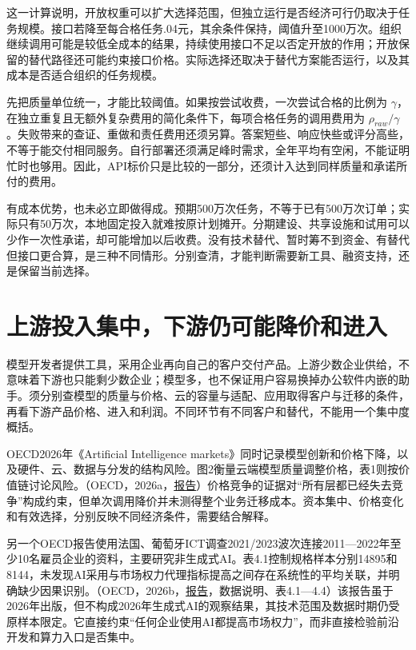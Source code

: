 \documentclass[UTF8,fontset=windows,12pt,a4paper,oneside,openany]{ctexbook}
\begin{document}
这一计算说明，开放权重可以扩大选择范围，但独立运行是否经济可行仍取决于任务规模。接口若降至每合格任务.04元，其余条件保持，阈值升至1000万次。组织继续调用可能是较低全成本的结果，持续使用接口不足以否定开放的作用；开放保留的替代路径还可能约束接口价格。实际选择还取决于替代方案能否运行，以及其成本是否适合组织的任务规模。

先把质量单位统一，才能比较阈值。如果按尝试收费，一次尝试合格的比例为 $\gamma$，在独立重复且无额外复杂费用的简化条件下，每项合格任务的调用费用为 $\rho_{raw}/\gamma$。失败带来的查证、重做和责任费用还须另算。答案短些、响应快些或评分高些，不等于能交付相同服务。自行部署还须满足峰时需求，全年平均有空闲，不能证明忙时也够用。因此，API标价只是比较的一部分，还须计入达到同样质量和承诺所付的费用。

有成本优势，也未必立即做得成。预期500万次任务，不等于已有500万次订单；实际只有50万次，本地固定投入就难按原计划摊开。分期建设、共享设施和试用可以少作一次性承诺，却可能增加以后收费。没有技术替代、暂时筹不到资金、有替代但接口更合算，是三种不同情形。分别查清，才能判断需要新工具、融资支持，还是保留当前选择。

\section{上游投入集中，下游仍可能降价和进入}

模型开发者提供工具，采用企业再向自己的客户交付产品。上游少数企业供给，不意味着下游也只能剩少数企业；模型多，也不保证用户容易换掉办公软件内嵌的助手。须分别查模型的质量与价格、云的容量与适配、应用取得客户与迁移的条件，再看下游产品价格、进入和利润。不同环节有不同客户和替代，不能用一个集中度概括。

OECD2026年《Artificial Intelligence markets》同时记录模型创新和价格下降，以及硬件、云、数据与分发的结构风险。图2衡量云端模型质量调整价格，表1则按价值链讨论风险。（OECD，2026a，\href{https://doi.org/10.1787/d531d73f-en}{报告}）价格竞争的证据对“所有层都已经失去竞争”构成约束，但单次调用降价并未测得整个业务迁移成本。资本集中、价格变化和有效选择，分别反映不同经济条件，需要结合解释。

另一个OECD报告使用法国、葡萄牙ICT调查2021/2023波次连接2011—2022年至少10名雇员企业的资料，主要研究非生成式AI。表4.1控制规格样本分别14895和8144，未发现AI采用与市场权力代理指标提高之间存在系统性的平均关联，并明确缺少因果识别。（OECD，2026b，\href{https://doi.org/10.1787/6f88a1ea-en}{报告}，数据说明、表4.1—4.4）该报告虽于2026年出版，但不构成2026年生成式AI的观察结果，其技术范围及数据时期仍受原样本限定。它直接约束“任何企业使用AI都提高市场权力”，而非直接检验前沿开发和算力入口是否集中。
\end{document}
